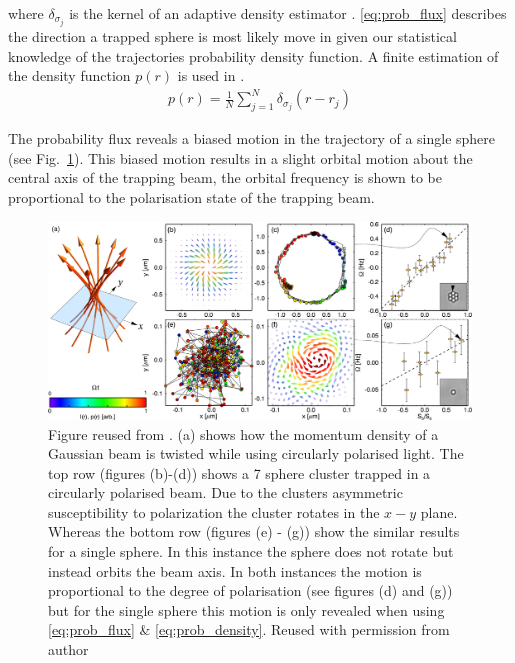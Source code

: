 where $\delta_{\sigma_j}$ is the kernel of an adaptive density estimator
\cite{Silverman1986}. \eqref{eq:prob_flux} describes the direction a trapped
sphere is most likely move in given our statistical knowledge of the 
trajectories probability density function. A finite estimation of the density
function $p(r)$ is used in \cite{Ruffner2012}.
\begin{align}
	p(r) = \frac{1}{N}\sum_{j=1}^N \delta_{\sigma_j}(r-r_j)
	\label{eq:prob_density}
\end{align}

The probability flux reveals a biased motion in the trajectory of a single 
sphere (see Fig.~\ref{fig:Ruffner_Grier}). This biased motion results in a
slight orbital motion about the central axis of the trapping beam, the orbital
frequency is shown to be proportional to the polarisation state of the trapping
beam. 
\begin{figure}[h!]
	\centering
	\includegraphics[width=\linewidth]{Ruffner_Grier_2012.pdf}
	\caption{Figure reused from \cite{Ruffner2012}. (a) shows how 
		the momentum density of a Gaussian beam is twisted while 
		using circularly polarised light. The top row (figures 
		(b)-(d)) shows a 7 sphere cluster trapped in a circularly 
		polarised beam. Due to the clusters asymmetric susceptibility 
		to polarization the cluster rotates in the $x-y$ plane. 
		Whereas the bottom row (figures (e) - (g)) show the similar 
		results for a single sphere. In this instance the sphere 
		does not rotate but instead orbits the beam axis. In both 
		instances the motion is proportional to the degree of 
		polarisation (see figures (d) and (g)) but for the single 
		sphere this motion is only revealed when using 
		\eqref{eq:prob_flux} \& \eqref{eq:prob_density}. Reused 
		with permission from author}
	\label{fig:Ruffner_Grier}
\end{figure}

